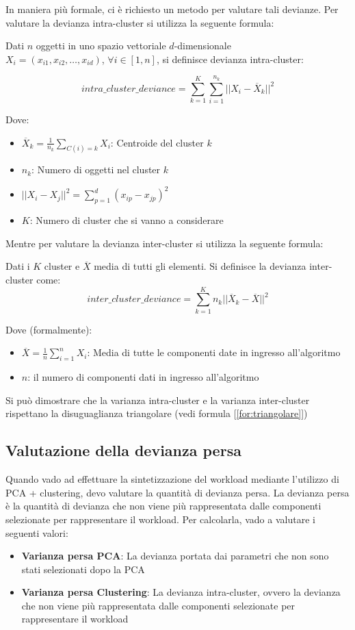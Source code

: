 In maniera più formale, ci è richiesto un metodo per valutare tali devianze. Per valutare la devianza intra-cluster si utilizza la seguente formula:

Dati \(n\) oggetti in uno spazio vettoriale \(d\)-dimensionale\\ \(X_i = (x_{i1}, x_{i2},\dots, x_{id})\), \(\forall i \in [1,n]\), si definisce devianza intra-cluster:

\[
intra\_cluster\_deviance = \sum_{k=1}^{K}\sum_{i=1}^{n_k}||X_i - \overline{X}_k||^2
\]

Dove:
\begin{itemize}
\item \(\overline{X}_k = \frac{1}{n_k}\sum_{C(i)=k}X_i\): Centroide del cluster \(k\)
\item \(n_k\): Numero di oggetti nel cluster \(k\)
\item \(||X_i - X_j||^2 = \sum_{p=1}^{d}(x_{ip} - x_{jp})^2\)
\item \(K\): Numero di cluster che si vanno a considerare
\end{itemize}

Mentre per valutare la devianza inter-cluster si utilizza la seguente formula:

Dati i \(K\) cluster e \(\overline{X}\) media di tutti gli elementi. Si definisce la devianza inter-cluster come:
\[
inter\_cluster\_deviance = \sum_{k=1}^{K}n_k||\overline{X}_k - \overline{X}||^2
\]

Dove (formalmente):
\begin{itemize}
\item \(\overline{X} = \frac{1}{n}\sum_{i=1}^{n}X_i\): Media di tutte le componenti date in ingresso all'algoritmo
\item \(n\): il numero di componenti dati in ingresso all'algoritmo
\end{itemize}

Si può dimostrare che la varianza intra-cluster e la varianza inter-cluster rispettano la disuguaglianza triangolare (vedi formula [\ref{for:triangolare}])

\subsection{Valutazione della devianza persa}
Quando vado ad effettuare la sintetizzazione del workload mediante l'utilizzo di PCA + clustering, devo valutare la quantità di devianza persa. La devianza persa è la quantità di devianza che non viene più rappresentata dalle componenti selezionate per rappresentare il workload. Per calcolarla, vado a valutare i seguenti valori:
\begin{itemize}
    \item \textbf{Varianza persa PCA}: La devianza portata dai parametri che non sono stati selezionati dopo la PCA
    \item \textbf{Varianza persa Clustering}: La devianza intra-cluster, ovvero la devianza che non viene più rappresentata dalle componenti selezionate per rappresentare il workload
\end{itemize}

